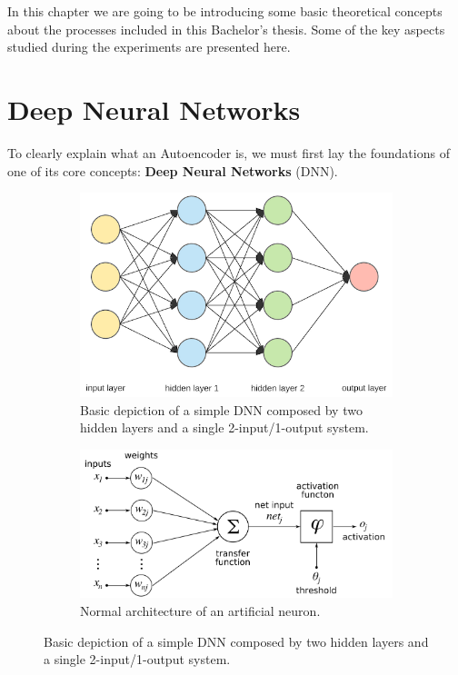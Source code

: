 
In this chapter we are going to be introducing some basic theoretical concepts about the processes included in this Bachelor's thesis. Some of the key aspects studied during the experiments are presented here.

\section{Deep Neural Networks}

To clearly explain what an Autoencoder is, we must first lay the foundations of one of its core concepts: \textbf{Deep Neural Networks} (DNN).\par
%
\begin{figure}[H]
	\begin{subfigure}{0.65\linewidth}  
		\centering
		\includegraphics[width=\linewidth]{Figuras_tfg/Figure2_tfg}
		\caption{Basic depiction of a simple DNN composed by two hidden layers and a single 2-input/1-output system.}
		\label{fig:fig2a} 
	\end{subfigure}
	
	\begin{subfigure}{0.65\linewidth} 
		\centering
		\includegraphics[width=\linewidth]{Figuras_tfg/ArtificialNeuronModel_english.png}
		\caption{Normal architecture of an artificial neuron.}
		\label{fig:fig2b} 
	\end{subfigure}
	\caption{Basic depiction of a simple DNN composed by two hidden layers and a single 2-input/1-output system.}
	\label{fig:fig2}
\end{figure}

